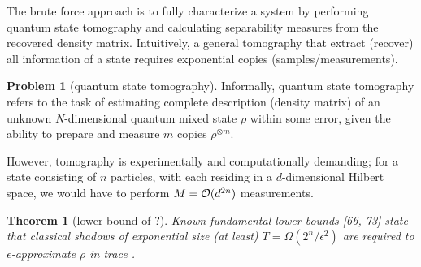 \documentclass[
reprint,
aps,
pra,
floatfix,
]{revtex4-2}
\theoremstyle{plain}
\newtheorem{theorem}{Theorem}
\theoremstyle{definition}
\newtheorem{problem}{Problem}
\newcommand{\sx}{\hat{\sigma}_x}
\newcommand{\sy}{\hat{\sigma}_y}
\newcommand{\sz}{\hat{\sigma}_z}
\newcommand{\dm}{\rho}
\begin{document}
The brute force approach is to fully characterize a system by performing quantum state tomography and calculating separability measures from the recovered density matrix.
Intuitively, a general tomography \cite{altepeterPhotonicStateTomography2005} that extract (recover) all information of a state requires exponential copies (samples/measurements).
\begin{problem}[quantum state tomography]\label{prm:full_tomography}
	Informally, quantum state tomography refers to the task of estimating complete description (density matrix) of an unknown $N$-dimensional quantum mixed state $\dm$ within some error, 
	given the ability to prepare and measure $m$ copies $\dm^{\otimes m}$.
\end{problem}
However, tomography is experimentally and computationally demanding; for a state consisting of $n$ particles, with each residing in a $d$-dimensional Hilbert space, we would have to perform $M = \mathcal{O}(d^{2n})$ measurements.
\begin{theorem}[lower bound of ?\cite{haahSampleoptimalTomographyQuantum2017}]
	Known fundamental lower bounds [66, 73] state that classical shadows of exponential size (at least) $T = \Omega( 2^n / \epsilon^2)$ are required to $\epsilon$-approximate $\dm$ in trace .
\end{theorem}
\end{document}
